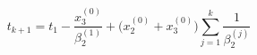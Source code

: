 \begin{equation}
t_{k+1}=t_1-\frac{x^{(0)}_3}{\beta^{(1)}_2}+\bigl(x^{(0)}_2+
x^{(0)}_3\bigr)\sum_{j=1}^k\frac{1}{\beta^{(j)}_2}
\label{energyk}\end{equation} 
